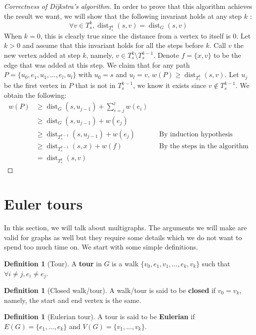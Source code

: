 \documentclass{tufte-handout}
\theoremstyle{definition}
\newtheorem{defn}[thm]{Definition}
\theoremstyle{remark}
\DeclareMathOperator{\dist}{dist}
\begin{document}
\begin{proof}[Correctness of Dijkstra's algorithm]
In order to prove that this algorithm achieves the result we want, we will show that the following invariant holds at any step $k$ : $$\forall v \in T_s^k, \dist_{T_s^{k}}(s,v) = \dist_G(s,v)$$
When $k=0$, this is clearly true since the distance from a vertex to itself is 0. Let $k>0$ and assume that this invariant holds for all the steps before $k$. Call $v$ the new vertex added at step $k$, namely, $v \in T_s^k\setminus T_s^{k-1}$. Denote $f = \{x,v\}$ to be the edge that was added at this step. We claim that for any path $P = \{u_0,e_1,u_1,\dots, e_l,u_l\}$ with $u_0 = s$ and $u_l = v$, $w(P) \geq \dist_{T_s^k}(s,v)$. Let $u_j$ be the first vertex in $P$ that is not in $T_s^{k-1}$, we know it exists since $v \notin T_s^{k-1}$. We obtain the following:
\begin{align*}
	w(P) &\geq \dist_G(s,u_{j-1}) + \sum_{i=j}^l w(e_i)\\
	&\geq \dist_G(s,u_{j-1}) + w(e_j)\\
	&\geq \dist_{T_s^{k-1}}(s,u_{j-1}) + w(e_j) && \mbox{By induction hypothesis}\\
	&\geq \dist_{T_s^{k-1}}(s,x) + w(f)&& \mbox{By the steps in the algorithm}\\
	&= \dist_{T_s^{k}}(s,v)
\end{align*}
\end{proof}
\section{Euler tours}
In this section, we will talk about multigraphs. The arguments we will make are valid for graphs as well but they require some details which we do not want to spend too much time on. We start with some simple definitions.

\begin{defn}[Tour]
	A \textbf{tour} in $G$ is a walk $\{v_0, e_1, v_1, \dots, e_k, v_k\}$ such that $\forall i\neq j, e_i \neq e_j$.
\end{defn}
\begin{defn}[Closed walk/tour]
	A walk/tour is said to be \textbf{closed} if $v_0 = v_k$, namely, the start and end vertex is the same.
\end{defn}
\begin{defn}[Eulerian tour]
	A tour is said to be \textbf{Eulerian} if $E(G) = \{e_1, \dots, e_k\}$ and $V(G) = \{v_1,\dots, v_k\}$.
\end{defn}
\end{document}
